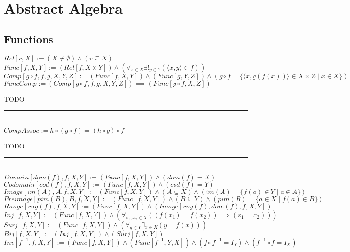 \documentclass{book}
\newcommand{\abr}{:=}
\newcommand{\st}{\mathbin{|}}
\begin{document}
\chapter{Abstract Algebra}
\section{Functions}
$Rel[r, X] \abr (X \neq \emptyset) \land (r \subseteq X)$ \\
$Func[f, X, Y] \abr (Rel[f, X \times Y]) \land (\forall_{x \in X} \exists!_{y \in Y}(\langle x, y \rangle \in f))$ \\
$Comp[g \circ f, f, g, X, Y, Z] \abr (Func[f, X, Y]) \land (Func[g, Y, Z]) \land (g \circ f = \{\langle x, g(f(x)) \rangle \in X \times Z \st x \in X\})$ \\

$FuncComp \abr (Comp[g \circ f, f, g, X, Y, Z]) \implies (Func[g \circ f, X, Z])$
\begin{enumerate}
  \lit TODO
\end{enumerate} \vspace{.75mm} \hrule \vspace{.75mm} \ \\ 

$CompAssoc \abr h \circ (g \circ f) = (h \circ g) \circ f$
\begin{enumerate}
  \lit TODO
\end{enumerate} \vspace{.75mm} \hrule \vspace{.75mm} \ \\ 

$Domain[dom(f), f, X, Y] \abr (Func[f, X, Y]) \land (dom(f) = X)$ \\
$Codomain[cod(f), f, X, Y] \abr (Func[f, X, Y]) \land (cod(f) = Y)$ \\
$Image[im(A), A, f, X, Y] \abr (Func[f, X, Y]) \land (A \subseteq X) \land (im(A) = \{f(a) \in Y \st a \in A\})$ \\
$Preimage[pim(B), B, f, X, Y] \abr (Func[f, X, Y]) \land (B \subseteq Y) \land (pim(B) = \{a \in X \st f(a) \in B\})$ \\
$Range[rng(f), f, X, Y] \abr (Func[f, X, Y]) \land (Image[rng(f), dom(f), f, X, Y])$ \\

$Inj[f, X, Y] \abr (Func[f, X, Y]) \land (\forall_{x_1, x_2 \in X}((f(x_1) = f(x_2)) \implies (x_1 = x_2)))$ \\ %
$Surj[f, X, Y] \abr (Func[f, X, Y]) \land (\forall_{y \in Y} \exists_{x \in X}(y = f(x)))$ \\ %
$Bij[f, X, Y] \abr (Inj[f, X, Y]) \land (Surj[f, X, Y])$ \\ %
$Inv[f^{-1}, f, X, Y] \abr (Func[f, X, Y]) \land (Func[f^{-1}, Y, X]) \land (f \circ f^{-1} = I_Y) \land (f^{-1} \circ f = I_X)$ \\
\end{document}
